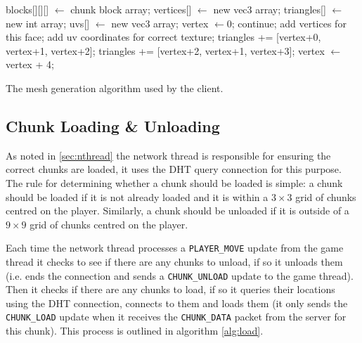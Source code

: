 \documentclass[12pt,notitlepage,a4paper]{report}
\begin{document}
	\begin{algorithm}
		\begin{algorithmic}
			\State blocks[][][] $\gets$ chunk block array;
			\State vertices[] $\gets$ new vec3 array;
			\State triangles[] $\gets$ new int array;
			\State uvs[] $\gets$ new vec3 array;
			\State vertex $\gets 0$;
								\State continue;
							\EndIf
							\State add vertices for this face;
							\State add uv coordinates for correct texture;
							\State triangles += [vertex+0, vertex+1, vertex+2];
							\State triangles += [vertex+2, vertex+1, vertex+3];
							\State vertex $\gets$ vertex + 4;
						\EndFor
					\EndFor
				\EndFor
			\EndFor
		\end{algorithmic}
		\caption{The mesh generation algorithm used by the client.}
		\label{alg:mesh}
	\end{algorithm}
	
	\subsection{Chunk Loading \& Unloading}
	\label{sec:loading}
	As noted in \cref{sec:nthread} the network thread is responsible for ensuring the correct chunks are loaded, it uses the DHT query connection for this purpose. The rule for determining whether a chunk should be loaded is simple: a chunk should be loaded if it is not already loaded and it is within a $3\times3$ grid of chunks centred on the player. Similarly, a chunk should be unloaded if it is outside of a $9\times9$ grid of chunks centred on the player.
	
	Each time the network thread processes a \texttt{PLAYER\_MOVE} update from the game thread it checks to see if there are any chunks to unload, if so it unloads them (i.e. ends the connection and sends a \texttt{CHUNK\_UNLOAD} update to the game thread). Then it checks if there are any chunks to load, if so it queries their locations using the DHT connection, connects to them and loads them (it only sends the \texttt{CHUNK\_LOAD} update when it receives the \texttt{CHUNK\_DATA} packet from the server for this chunk). This process is outlined in algorithm \ref{alg:load}.
	
\end{document}
